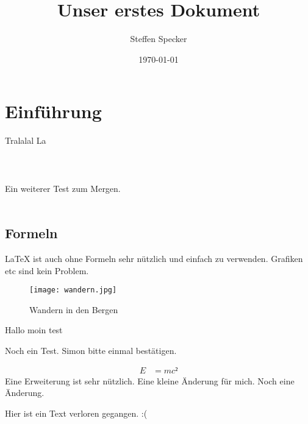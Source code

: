 \documentclass[12pt,a4paper]{article}
\author{Steffen Specker}
\title{Unser erstes Dokument}
\date{\today}
\begin{document}
\maketitle
\tableofcontents

\newpage

\section{Einführung}

Tralalal La
\\
\\
\\
\\
Ein weiterer Test zum Mergen.
\\
\\




\subsection{Formeln}

\LaTeX{} ist auch ohne Formeln sehr nützlich und einfach zu verwenden. Grafiken etc sind kein Problem.


\begin{figure}[h]
\begin{center}
\texttt{[image: wandern.jpg]}
\caption{Wandern in den Bergen}
\label{wandern.pgtest}

\end{center}
\end{figure}

Hallo moin test

Noch ein Test. Simon bitte einmal bestätigen.

\begin{align*}
E &= mc²
\end{align*}
Eine Erweiterung ist sehr nützlich.
Eine kleine Änderung für mich.
Noch eine Änderung.


Hier ist ein Text verloren gegangen. :(
\end{document}
